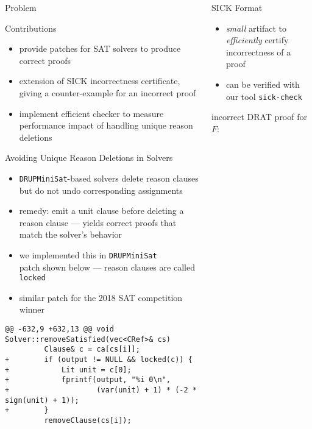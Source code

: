 \documentclass[final,hyperref={pdfpagelabels=true}]{beamer}
\begin{document}
\begin{frame}[fragile]
\begin{columns}[t]
\begin{column}{.45\textwidth}
\begin{block}{Problem}
    \end{block}

    \begin{block}{Contributions}
        \begin{itemize}
		\item provide patches for SAT solvers to produce correct proofs
		\item extension of SICK incorrectness certificate, giving
		a counter-example for an incorrect proof
		\item implement efficient checker to measure performance
		impact of handling unique reason deletions
        \end{itemize}
    \end{block}


    \begin{block}{Avoiding Unique Reason Deletions in Solvers}
	\begin{itemize}
	    \item \texttt{DRUPMiniSat}-based solvers delete reason clauses
	    but do not undo corresponding assignments
            \item remedy: emit a unit clause before deleting a reason clause
            --- yields correct proofs that match the solver's behavior
	    \item we implemented this in \texttt{DRUPMiniSat}\\
		patch shown below --- reason clauses are called \texttt{locked}
            \item similar patch for the 2018 SAT competition winner
	\end{itemize}
	\vspace{0.5cm}
        {\footnotesize
            \begin{verbatim}
@@ -632,9 +632,13 @@ void Solver::removeSatisfied(vec<CRef>& cs)
         Clause& c = ca[cs[i]];
+        if (output != NULL && locked(c)) {
+            Lit unit = c[0];
+            fprintf(output, "%i 0\n",
+                    (var(unit) + 1) * (-2 * sign(unit) + 1));
+        }
         removeClause(cs[i]);
            \end{verbatim}
        }
    \end{block}
    \end{column}

    \begin{column}{.45\textwidth}
    \begin{block}{SICK Format}
        \begin{itemize}
            \item \emph{small} artifact to \emph{efficiently} certify
            incorrectness of a proof
            \item can be verified with our tool \texttt{sick-check}
        \end{itemize}
        \vspace{.5cm}
        incorrect DRAT proof for $F$:


\end{block}
\end{column}
\end{columns}
\end{frame}
\end{document}
